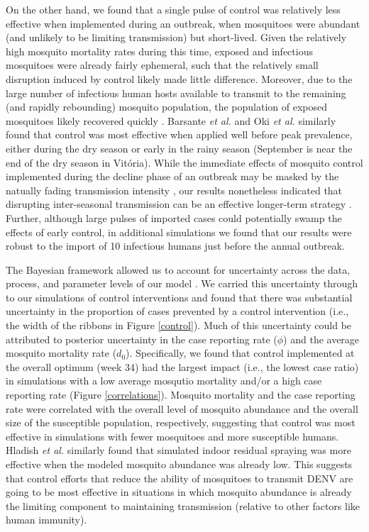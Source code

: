 \documentclass[10pt,letterpaper]{article}
\begin{document}
On the other hand, we found that a single pulse of control was relatively less effective when implemented during an outbreak, when mosquitoes were abundant (and unlikely to be limiting transmission) but short-lived.
Given the relatively high mosquito mortality rates during this time, exposed and infectious mosquitoes were already fairly ephemeral, such that the relatively small disruption induced by control likely made little difference.
Moreover, due to the large number of infectious human hosts available to transmit to the remaining (and rapidly rebounding) mosquito population, the population of exposed mosquitoes likely recovered quickly \cite{Newton1992, Burattini2008}.
Barsante \emph{et al.} \cite{Barsante2015} and Oki \emph{et al.} \cite{Oki2011} similarly found that control was most effective when applied well before peak prevalence, either during the dry season \cite{Barsante2015} or early in the rainy season \cite{Oki2011} (September is near the end of the dry season in Vit\'oria).
While the immediate effects of mosquito control implemented during the decline phase of an outbreak may be masked by the natually fading transmission intensity \cite{Stoddard2014}, our results nonetheless indicated that disrupting inter-seasonal transmission can be an effective longer-term strategy \cite{Hladish2018}.
Further, although large pulses of imported cases could potentially swamp the effects of early control, in additional simulations we found that our results were robust to the import of 10 infectious humans just before the annual outbreak.

The Bayesian framework allowed us to account for uncertainty across the data, process, and parameter levels of our model \cite{Berliner1996}.
We carried this uncertainty through to our simulations of control interventions \cite{Elderd2006} and found that there was substantial uncertainty in the proportion of cases prevented by a control intervention (i.e., the width of the ribbons in Figure \ref{control}).
Much of this uncertainty could be attributed to posterior uncertainty in the case reporting rate ($\phi$) and the average mosquito mortality rate ($d_0$).
Specifically, we found that control implemented at the overall optimum (week 34) had the largest impact (i.e., the lowest case ratio) in simulations with a low average mosqutio mortality and/or a high case reporting rate (Figure \ref{correlations}).
Mosquito mortality and the case reporting rate were correlated with the overall level of mosquito abundance and the overall size of the susceptible population, respectively, suggesting that control was most effective in simulations with fewer mosquitoes and more susceptible humans.  
Hladish \emph{et al.} \cite{Hladish2018} similarly found that simulated indoor residual spraying was more effective when the modeled mosquito abundance was already low.
This suggests that control efforts that reduce the ability of mosquitoes to transmit DENV are going to be most effective in situations in which mosquito abundance is already the limiting component to maintaining transmission (relative to other factors like human immunity).
\end{document}
